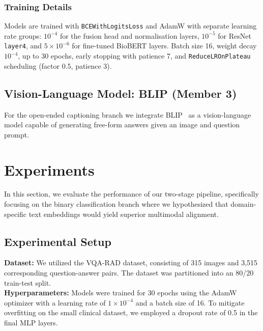 \documentclass{article}
\begin{document}
\subsubsection{Training Details}
Models are trained with \texttt{BCEWithLogitsLoss} and AdamW with separate
learning rate groups: $10^{-4}$ for the fusion head and normalisation layers,
$10^{-5}$ for ResNet \texttt{layer4}, and $5 \times 10^{-6}$ for fine-tuned
BioBERT layers. Batch size 16, weight decay $10^{-4}$, up to 30 epochs,
early stopping with patience 7, and \texttt{ReduceLROnPlateau} scheduling
(factor 0.5, patience 3).

\subsection{Vision-Language Model: BLIP (Member 3)}

For the open-ended captioning branch we integrate
BLIP~\cite{TODO-blip} %
as a vision-language model capable of generating free-form answers given an
image and question prompt.




\section{Experiments}
\label{sec:experiments}

In this section, we evaluate the performance of our two-stage pipeline, specifically focusing on the binary classification branch where we hypothesized that domain-specific text embeddings would yield superior multimodal alignment.

\subsection{Experimental Setup}
\textbf{Dataset:} We utilized the VQA-RAD dataset, consisting of 315 images and 3,515 corresponding question-answer pairs. The dataset was partitioned into an 80/20 train-test split. \\
\textbf{Hyperparameters:} Models were trained for 30 epochs using the AdamW optimizer with a learning rate of $1 \times 10^{-4}$ and a batch size of 16. To mitigate overfitting on the small clinical dataset, we employed a dropout rate of 0.5 in the final MLP layers.
\end{document}
